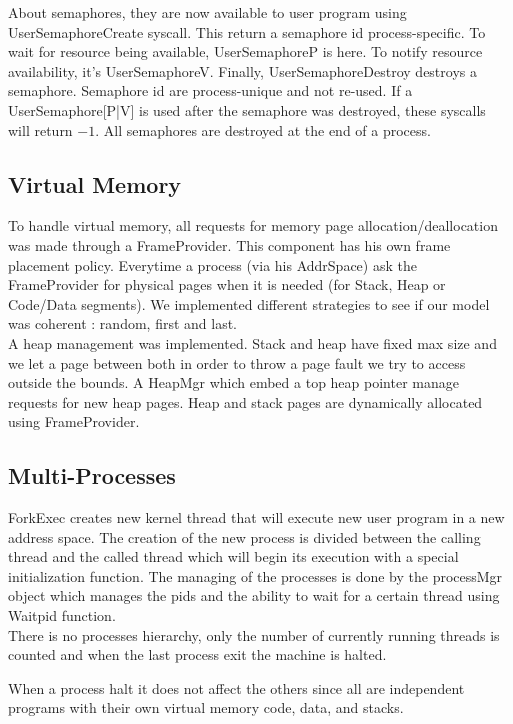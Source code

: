 About semaphores, they are now available to user program using
UserSemaphoreCreate syscall. This return a semaphore id process-specific. To
wait for resource being available, \textrm{UserSemaphoreP} is here. To notify resource
availability, it's\textrm{ UserSemaphoreV}. Finally,\textrm{ UserSemaphoreDestroy} destroys a
semaphore. Semaphore id are process-unique and not re-used. If a
UserSemaphore[P|V] is used after the semaphore was destroyed, these syscalls
will return $-1$. All semaphores are destroyed at the end of a process.

\subsection{Virtual Memory}

To handle virtual memory, all requests for memory page allocation/deallocation
was made through a FrameProvider. This component has his own frame placement
policy. Everytime a process (via his AddrSpace) ask the FrameProvider for
physical pages when it is needed (for Stack, Heap or Code/Data segments).
We implemented different strategies to see if our model was coherent : random,
first and last.\\

A heap management was implemented. Stack and heap have fixed max size and
we let a page between both in order to throw a page fault we try to access
outside the bounds. A HeapMgr which embed a top heap pointer manage requests for
new heap pages.
Heap and stack pages are dynamically allocated using FrameProvider.

\subsection{Multi-Processes}
ForkExec creates new kernel thread that will execute new user program in a new
address space. The creation of the new process is divided between the calling
thread and the called thread which will begin its execution with a special
initialization function. The managing of the processes is done by the processMgr
object which manages the pids and the ability to wait for a certain thread using
Waitpid function.\\

There is no processes hierarchy, only the number of currently running threads is
counted and when the last process exit the machine is halted.

When a process halt it does not affect the others since all are independent
programs with their own virtual memory code, data, and stacks.\\

